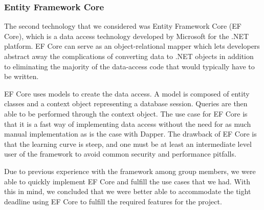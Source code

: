 \subsubsection{Entity Framework Core}
The second technology that we considered was Entity Framework Core (EF Core), which is a data access technology developed by Microsoft for the .NET platform. EF Core can serve as an object-relational mapper\cite{Object_relational_mapping} which lets developers abstract away the complications of converting data to .NET objects in addition to eliminating the majority of the data-access code that would typically have to be written.

EF Core uses models to create the data access. A model is composed of entity classes and a context object representing a database session.
Queries are then able to be performed through the context object. 
The use case for EF Core is that it is a fast way of implementing data access without the need for as much manual implementation as is the case with Dapper. 
The drawback of EF Core is that the learning curve is steep, and one must be at least an intermediate level user of the framework to avoid common security and performance pitfalls\cite{EFCore}.

Due to previous experience with the framework among group members, we were able to quickly implement EF Core and fulfill the use cases that we had.
With this in mind, we concluded that we were better able to accommodate the tight deadline using EF Core to fulfill the required features for the \knox{} project.